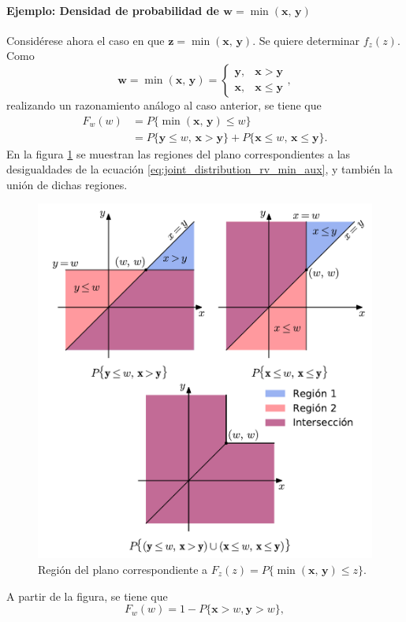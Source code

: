 \documentclass[a4paper]{report}
\newcommand{\x}{\mathbf{x}}
\newcommand{\y}{\mathbf{y}}
\newcommand{\w}{\mathbf{w}}
\newcommand{\z}{\mathbf{z}}
\begin{document}
\paragraph{\texorpdfstring{Ejemplo: Densidad de probabilidad de \(\w=\min(\x,\,\y)\)}{}}

Considérese ahora el caso en que \(\z=\min(\x,\,\y)\). Se quiere determinar \(f_z(z)\). Como
\[
 \w=\min(\x,\,\y)=
 \left\{\begin{array}{ll}
  \y, & \x>\y \\
  \x, & \x\leq\y
 \end{array} \right.,
\]
realizando un razonamiento análogo al caso anterior, se tiene que
\begin{align}\label{eq:joint_distribution_rv_min_aux}
 F_w(w)&=P\{\min(\x,\,\y)\leq w\}\nonumber\\
   &=P\{\y\leq w,\, \x>\y\}+P\{\x\leq w,\,\x\leq\y\}.
\end{align}
En la figura \ref{fig:joint_distribution_region_rv_min} se muestran las regiones del plano correspondientes a las desigualdades de la ecuación \ref{eq:joint_distribution_rv_min_aux}, y también la unión de dichas regiones.
\begin{figure}[!htb]
\begin{center}
 \includegraphics[width=0.7\columnwidth]{figuras/joint_distribution_region_rv_min.pdf}
\caption{\label{fig:joint_distribution_region_rv_min} Región del plano correspondiente a \(F_z(z)=P\{\min(\x,\,\y)\leq z\}\).}
\end{center}
\end{figure}
A partir de la figura, se tiene que
\[
 F_w(w)=1-P\{\x>w,\y>w\},
\]
\end{document}
